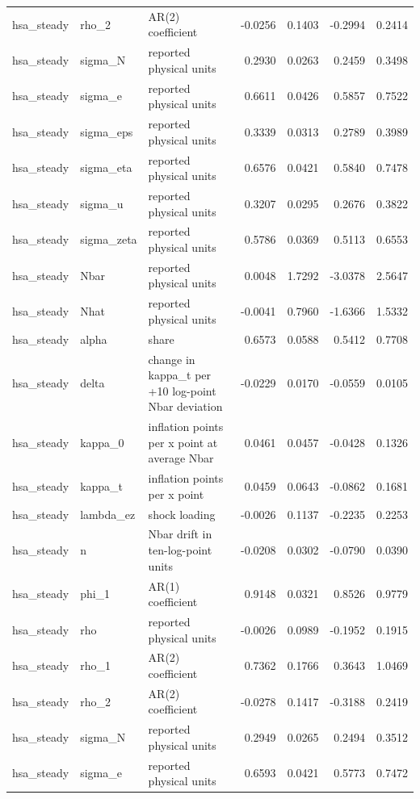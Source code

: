 \begin{tabular}{lllrrrr}
hsa\_steady & rho\_2 & AR(2) coefficient & -0.0256 & 0.1403 & -0.2994 & 0.2414 \\
hsa\_steady & sigma\_N & reported physical units & 0.2930 & 0.0263 & 0.2459 & 0.3498 \\
hsa\_steady & sigma\_e & reported physical units & 0.6611 & 0.0426 & 0.5857 & 0.7522 \\
hsa\_steady & sigma\_eps & reported physical units & 0.3339 & 0.0313 & 0.2789 & 0.3989 \\
hsa\_steady & sigma\_eta & reported physical units & 0.6576 & 0.0421 & 0.5840 & 0.7478 \\
hsa\_steady & sigma\_u & reported physical units & 0.3207 & 0.0295 & 0.2676 & 0.3822 \\
hsa\_steady & sigma\_zeta & reported physical units & 0.5786 & 0.0369 & 0.5113 & 0.6553 \\
hsa\_steady & Nbar & reported physical units & 0.0048 & 1.7292 & -3.0378 & 2.5647 \\
hsa\_steady & Nhat & reported physical units & -0.0041 & 0.7960 & -1.6366 & 1.5332 \\
hsa\_steady & alpha & share & 0.6573 & 0.0588 & 0.5412 & 0.7708 \\
hsa\_steady & delta & change in kappa\_t per +10 log-point Nbar deviation & -0.0229 & 0.0170 & -0.0559 & 0.0105 \\
hsa\_steady & kappa\_0 & inflation points per x point at average Nbar & 0.0461 & 0.0457 & -0.0428 & 0.1326 \\
hsa\_steady & kappa\_t & inflation points per x point & 0.0459 & 0.0643 & -0.0862 & 0.1681 \\
hsa\_steady & lambda\_ez & shock loading & -0.0026 & 0.1137 & -0.2235 & 0.2253 \\
hsa\_steady & n & Nbar drift in ten-log-point units & -0.0208 & 0.0302 & -0.0790 & 0.0390 \\
hsa\_steady & phi\_1 & AR(1) coefficient & 0.9148 & 0.0321 & 0.8526 & 0.9779 \\
hsa\_steady & rho & reported physical units & -0.0026 & 0.0989 & -0.1952 & 0.1915 \\
hsa\_steady & rho\_1 & AR(2) coefficient & 0.7362 & 0.1766 & 0.3643 & 1.0469 \\
hsa\_steady & rho\_2 & AR(2) coefficient & -0.0278 & 0.1417 & -0.3188 & 0.2419 \\
hsa\_steady & sigma\_N & reported physical units & 0.2949 & 0.0265 & 0.2494 & 0.3512 \\
hsa\_steady & sigma\_e & reported physical units & 0.6593 & 0.0421 & 0.5773 & 0.7472 \\

\end{tabular}
